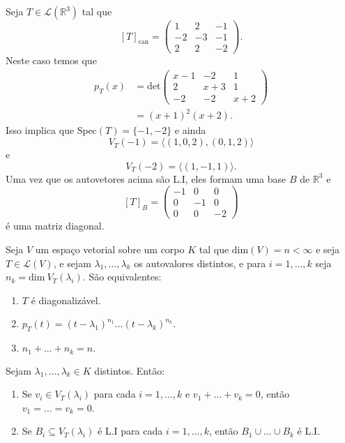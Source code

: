 \documentclass[11pt,twoside,a4paper]{book}
\begin{document}
\begin{exemplo}
Seja \(T\in\mathcal{L}(\mathbb{R}^3)\) tal que
\[[T]_{\text{can}}=\begin{pmatrix}
1 & 2 & -1\\-2 & -3 & -1\\ 2 & 2 & -2
\end{pmatrix}.\]
Neste caso temos que
\begin{align*}
p_T(x)&=\text{det}\begin{pmatrix}
x-1 & -2 & 1\\2 & x+3 & 1\\ -2 & -2 & x+2
\end{pmatrix}\\&=(x+1)^2(x+2).
\end{align*}
Isso implica que \(\text{Spec}(T)=\{-1,-2\}\) e ainda \[V_T(-1)=\langle(1,0,2),(0,1,2)\rangle\] e
\[V_T(-2)=\langle (1,-1,1)\rangle.\]
Uma vez que os autovetores acima são L.I, eles formam uma base \(B\) de \(\mathbb{R}^3\) e 
\[[T]_B=\begin{pmatrix}
-1 & 0 & 0\\0 & -1 & 0\\ 0 & 0 & -2
\end{pmatrix}\]
é uma matriz diagonal.
\end{exemplo}
\begin{teorema}\label{diagonal}
Seja \(V\) um espaço vetorial sobre um corpo \(K\) tal que \(\text{dim}(V)=n<\infty\) e seja \(T\in\mathcal{L}(V)\), e sejam $\lambda_1,\dots,\lambda_k$ os autovalores distintos, e para $i=1,\dots,k$ seja $n_k=\text{dim} \ V_T(\lambda_i)$. São equivalentes:
\begin{enumerate}
\item \(T\) é diagonalizável.
\item \(p_T(t)=(t-\lambda_1)^{n_1}\ldots(t-\lambda_k)^{n_k}\).
\item \(n_1+\ldots+n_k=n.\)
\end{enumerate}
\end{teorema}
\begin{lema}\label{autoespaco}
Sejam \(\lambda_1,\dots,\lambda_k\in K\) distintos. Então:
\begin{enumerate}
\item Se \(v_i \in V_T(\lambda_i)\) para cada \(i=1,\dots,k\) e \(v_1+\ldots+v_k=0\), então \(v_1=\ldots=v_k=0\).
\item Se \(B_i\subseteq V_T(\lambda_i)\) é L.I para cada \(i=1,\dots,k\), então $B_1\cup\dots\cup B_k$ é L.I.
\end{enumerate}
\end{lema}
\end{document}
